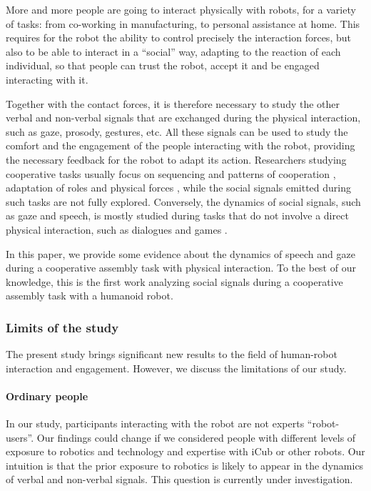 More and more people are going to interact physically with robots, for a variety of tasks: from co-working in manufacturing, to personal assistance at home.
This requires for the robot the ability to control precisely the interaction forces, but also to be able to interact in a ``social'' way, adapting to the reaction of each individual, so that people can trust the robot, accept it and be engaged interacting with it. 


Together with the contact forces, it is therefore necessary to study the other verbal and non-verbal signals that are exchanged during the physical interaction, such as gaze, prosody, gestures, etc.
All these signals can be used to study the comfort and the engagement of the people interacting with the robot, providing the necessary feedback for the robot to adapt its action.
Researchers studying cooperative tasks usually focus on sequencing and patterns of cooperation \cite{Wilcox2012}, adaptation of roles and physical forces \cite{Stefanov2009}, while the social signals emitted during such tasks are not fully explored.
Conversely, the dynamics of social signals, such as gaze and speech, is mostly studied during tasks that do not involve a direct physical interaction, such as dialogues and games \cite{Boucenna2014,Anzalone2015engagement,Castellano2009}.

In this paper, we provide some evidence about the dynamics of speech and gaze during a cooperative assembly task with physical interaction. To the best of our knowledge, this is the first work analyzing social signals during a cooperative assembly task with a humanoid robot.






\subsubsection{Limits of the study}

The present study brings significant new results to the field of human-robot interaction and engagement. However, we discuss the limitations of our study.

\paragraph{Ordinary people}

In our study, participants interacting with the robot are not experts ``robot-users''. Our findings could change if we considered people with different levels of exposure to robotics and technology and expertise with iCub or other robots. 
Our intuition is that the prior exposure to robotics is likely to appear in the dynamics of verbal and non-verbal signals.
This question is currently under investigation.

